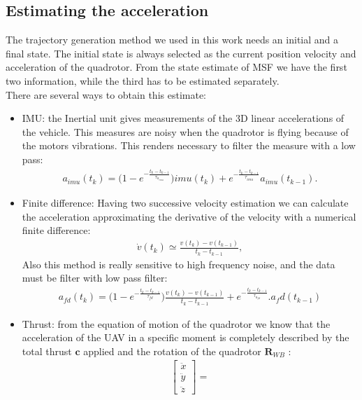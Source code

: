 \subsection{Estimating the acceleration} \label{subsec:acceleration}
The trajectory generation method we used in this work needs an initial and a final state. The initial state is always selected as the current position velocity and acceleration of the quadrotor. From the state estimate of MSF we have the first two information, while the third has to be estimated separately.\\
There are several ways to obtain this estimate:
\begin{itemize}
\item IMU: the Inertial unit gives measurements of the 3D linear accelerations of the vehicle. This measures are noisy when the quadrotor is flying because of the motors vibrations. This renders necessary to filter the measure with a low pass:
 \begin{align}
a_{imu}(t_k) = \Big(1-e^{-\frac{t_k-t_{k-1}}{\tau_{a_{imu}}}}\Big)imu(t_k) + e^{-\frac{t_k-t_{k-1}}{\tau_{imu}}} a_{imu}(t_{k-1}).
\label{eq:imu_acc}
\end{align}
\item Finite difference: Having two successive velocity estimation we can calculate the acceleration approximating the derivative of the velocity with a numerical finite difference:
\begin{align}
\dot{v}(t_k) \simeq \frac{v(t_k)-v(t_{k-1})}{t_k-t_{k-1}},
\label{eq:finite_difference}
\end{align}
Also this method is really sensitive to high frequency noise, and the data must be filter with low pass filter:
 \begin{align}
a_{fd}(t_k) =  \Big(1-e^{-\frac{t_k-t_{k-1}}{\tau_{fd}}}\Big)\frac{v(t_k)-v(t_{k-1})}{t_k-t_{k-1}} + e^{-\frac{t_k-t_{k-1}}{\tau_{a_{fd}}}}. a_fd(t_{k-1})
\label{eq:finite_difference}
\end{align}
\item Thrust: from the equation of motion of the quadrotor we know that the acceleration of the UAV in a specific moment is completely described by the total thrust $\boldsymbol{c}$ applied and the rotation of the quadrotor $\boldsymbol{R}_{WB}$ :
\begin{align}
{\begin{bmatrix}
\ddot{x} \\[10pt]
\ddot{y} \\[10pt]
\ddot{z}
\end{bmatrix}}=

\end{align}
\end{itemize}
